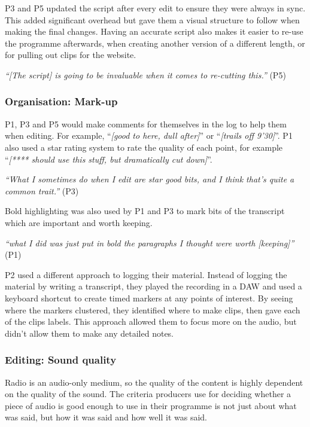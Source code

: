 P3 and P5 updated the script after every edit to ensure they were always in sync. This added significant overhead but
gave them a visual structure to follow when making the final changes.
Having an accurate script also makes it easier to re-use the programme afterwards, when creating another version of a
different length, or for pulling out clips for the website.

\textit{``[The script] is going to be invaluable when it comes to re-cutting this.''} (P5)

\subsubsection{Organisation: Mark-up}

P1, P3 and P5 would make comments for themselves in the log to help them when
editing. For example, ``\textit{[good to here, dull after]}'' or
``\textit{[trails off 9'30]}''. P1 also used a star rating system to rate the
quality of each point, for example ``\textit{[**** should use this stuff, but
  dramatically cut down]}''.

\textit{``What I sometimes do when I edit are star good bits, and I think
  that's quite a common trait.''} (P3)

Bold highlighting was also used by P1 and P3 to mark bits of the transcript
which are important and worth keeping.

\textit{``what I did was just put in bold the paragraphs I thought were worth
  [keeping]''} (P1)

P2 used a different approach to logging their material. Instead of logging the material by writing a transcript, they
played the recording in a DAW and used a keyboard shortcut to create timed markers at any points of interest. By seeing
where the markers clustered, they identified where to make clips, then gave each of the clips labels. This approach
allowed them to focus more on the audio, but didn't allow them to make any detailed notes.

\subsubsection{Editing: Sound quality}\label{sec:existing-quality}

Radio is an audio-only medium, so the quality of the content is highly dependent on the quality of the sound.  The
criteria producers use for deciding whether a piece of audio is good enough to use in their programme is not just about
what was said, but how it was said and how well it was said.

